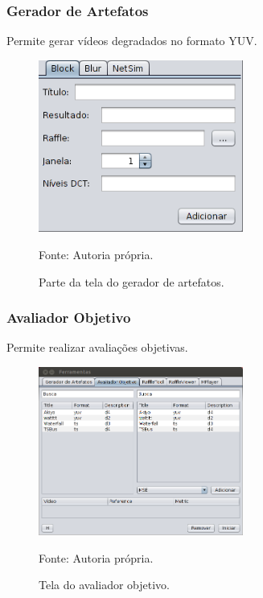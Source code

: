         \begin{frame}\frametitle{Gerador de Artefatos}
            Permite gerar vídeos degradados no formato YUV.
		    \begin{figure}
			    \includegraphics[width=0.6\textwidth]{./imgs/ferramentas-gerador.png}
			    \caption{Parte da tela do gerador de artefatos.}
			    \tiny
			    Fonte: Autoria própria.
		    \end{figure}
        \end{frame}
        
        \begin{frame}\frametitle{Avaliador Objetivo}
            Permite realizar avaliações objetivas.
		    \begin{figure}
			    \includegraphics[width=0.6\textwidth]{./imgs/ferramentas-avaliador.png}
			    \caption{Tela do avaliador objetivo.}
			    \tiny
			    Fonte: Autoria própria.
		    \end{figure}
        \end{frame}
        

